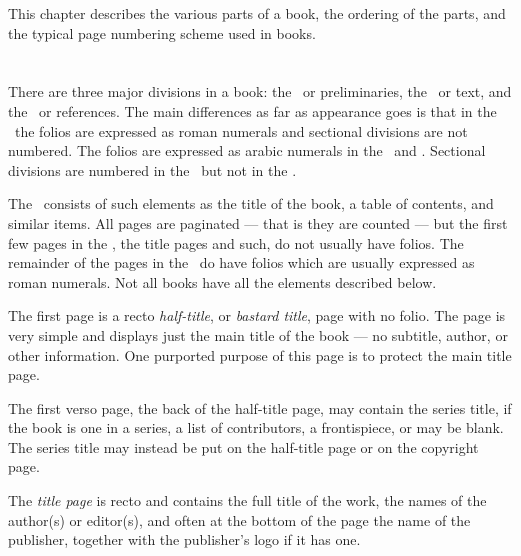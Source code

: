\documentclass[10pt,a4paper,oneside,extrafontsizes]{memoir}%
\begin{document}
\begin{paracol}{2}
\switchEng
    This chapter describes the various parts of a book, the 
ordering of the parts, and the typical page numbering scheme used
in books. 
\end{paracol}

\section{\prFrontmatter}

\begin{paracol}{2}
\switchEng
    There are three major divisions in a book: 
the \pixfrontmatter\ or preliminaries, 
the \pixmainmatter\ or text, 
and the \pixbackmatter\ or references. 
The main differences as
far as appearance goes is that in the \pixfrontmatter\ the folios are 
expressed as roman numerals and sectional divisions are not numbered. The 
folios are expressed as arabic numerals in the \pixmainmatter\ 
and \pixbackmatter. Sectional
divisions are numbered in the \pixmainmatter\ but not in the \pixbackmatter.

    The \pixfrontmatter\ consists of such elements as the title
of the book, a table of contents\ixtoc, and similar items. All pages are
paginated\index{pagination} --- that is they are counted --- but the first 
few pages in the \pixfrontmatter, the title pages and such, do not usually have 
folios\index{folio}. 
The remainder of the pages in the \pixfrontmatter\ do have folios 
which are usually expressed as roman numerals. Not all
books have all the elements described below.

    The first page is a recto 
\emph{half-title},
or \emph{bastard title}\index{bastard title page},
page with no folio\index{folio}. 
The page is very simple and displays just the main title of the book --- 
no subtitle, author, or other information. One purported purpose of this
page is to protect the main title page.

    The first verso page, the back of the half-title page, may contain the 
series title, if the book is one in a series, a list of contributors, 
a frontispiece, or may be blank. The series title may instead be put on the 
half-title page or on the copyright page.

   The \emph{title page} is recto and contains the full 
title of the work, the names of the author(s) or editor(s), and often at the
bottom of the page the name of the publisher, together with the publisher's 
logo if it has one.


\end{paracol}
\end{document}
